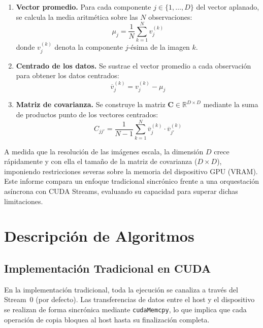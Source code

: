 \documentclass[12pt, a4paper]{article}
\begin{document}
\begin{enumerate}
    \item \textbf{Vector promedio.} Para cada componente $j \in \{1, \dots, D\}$
    del vector aplanado, se calcula la media aritmética sobre las $N$
    observaciones:
    \begin{equation}
        \mu_j = \frac{1}{N} \sum_{k=1}^{N} v_j^{(k)}
    \end{equation}
    donde $v_j^{(k)}$ denota la componente $j$-ésima de la imagen $k$.

    \item \textbf{Centrado de los datos.} Se sustrae el vector promedio a cada
    observación para obtener los datos centrados:
    \begin{equation}
        \overline{v}_j^{(k)} = v_j^{(k)} - \mu_j
    \end{equation}

    \item \textbf{Matriz de covarianza.} Se construye la matriz
    $\mathbf{C} \in \mathbb{R}^{D \times D}$ mediante la suma de productos
    punto de los vectores centrados:
    \begin{equation}
        C_{jj'} = \frac{1}{N-1} \sum_{k=1}^{N}
        \overline{v}_j^{(k)} \cdot \overline{v}_{j'}^{(k)}
    \end{equation}
\end{enumerate}

A medida que la resolución de las imágenes escala, la dimensión $D$ crece
rápidamente y con ella el tamaño de la matriz de covarianza ($D \times D$),
imponiendo restricciones severas sobre la memoria del dispositivo GPU (VRAM).
Este informe compara un enfoque tradicional sincrónico frente a una
orquestación asíncrona con CUDA Streams, evaluando su capacidad para superar
dichas limitaciones.

\section{Descripción de Algoritmos}

\subsection{Implementación Tradicional en CUDA}

En la implementación tradicional, toda la ejecución se canaliza a través del
Stream~0 (por defecto). Las transferencias de datos entre el host y el
dispositivo se realizan de forma sincrónica mediante \texttt{cudaMemcpy}, lo
que implica que cada operación de copia bloquea al host hasta su finalización
completa.
\end{document}
